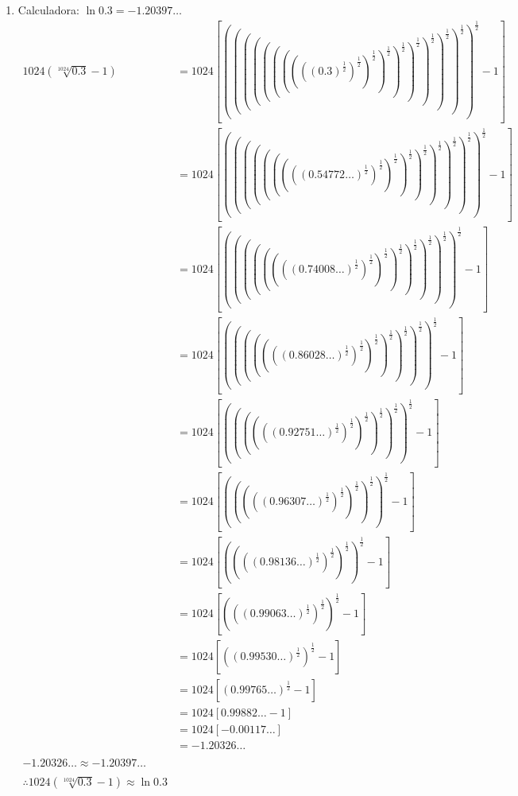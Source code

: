 \documentclass[12pt]{article}
\begin{document}
\begin{enumerate}[label=\alph*)]
\begin{enumerate}
\item Calculadora: $\ln{0.3} = -1.20397\ldots$
  \begin{align*}
    1024(\sqrt[1024]{0.3}-1)
    &= 1024 \left[
      ((((((((((0.3)^{\frac{1}{2}})^{\frac{1}{2}})^{\frac{1}{2}})^{\frac{1}{2}})^{\frac{1}{2}})^{\frac{1}{2}})^{\frac{1}{2}})^{\frac{1}{2}})^{\frac{1}{2}})^{\frac{1}{2}}
      -1\right]\\
    &= 1024 \left[
      (((((((((0.54772\ldots)^{\frac{1}{2}})^{\frac{1}{2}})^{\frac{1}{2}})^{\frac{1}{2}})^{\frac{1}{2}})^{\frac{1}{2}})^{\frac{1}{2}})^{\frac{1}{2}})^{\frac{1}{2}}
      -1\right]\\
    &= 1024 \left[
      ((((((((0.74008\ldots)^{\frac{1}{2}})^{\frac{1}{2}})^{\frac{1}{2}})^{\frac{1}{2}})^{\frac{1}{2}})^{\frac{1}{2}})^{\frac{1}{2}})^{\frac{1}{2}}
      -1\right]\\
    &= 1024 \left[
      (((((((0.86028\ldots)^{\frac{1}{2}})^{\frac{1}{2}})^{\frac{1}{2}})^{\frac{1}{2}})^{\frac{1}{2}})^{\frac{1}{2}})^{\frac{1}{2}}
      -1\right]\\
    &= 1024 \left[
      ((((((0.92751\ldots)^{\frac{1}{2}})^{\frac{1}{2}})^{\frac{1}{2}})^{\frac{1}{2}})^{\frac{1}{2}})^{\frac{1}{2}}
      -1\right]\\
    &= 1024 \left[
      (((((0.96307\ldots)^{\frac{1}{2}})^{\frac{1}{2}})^{\frac{1}{2}})^{\frac{1}{2}})^{\frac{1}{2}}
      -1\right]\\
    &= 1024 \left[
      ((((0.98136\ldots)^{\frac{1}{2}})^{\frac{1}{2}})^{\frac{1}{2}})^{\frac{1}{2}}
      -1\right]\\
    &= 1024 \left[
      (((0.99063\ldots)^{\frac{1}{2}})^{\frac{1}{2}})^{\frac{1}{2}}
      -1\right]\\
    &= 1024 \left[
      ((0.99530\ldots)^{\frac{1}{2}})^{\frac{1}{2}}
      -1\right]\\
    &= 1024 \left[
      (0.99765\ldots)^{\frac{1}{2}}
      -1\right]\\
    &= 1024 \left[
      0.99882\ldots
      -1\right]\\
    &= 1024 [-0.00117\ldots] \\
    &= -1.20326\ldots \\ \\
    -1.20326\ldots \approx -1.20397\ldots\\ \\
    \therefore
    1024(\sqrt[1024]{0.3}-1)\approx \ln{0.3}
  \end{align*}
  

\end{enumerate}
\end{enumerate}
\end{document}
